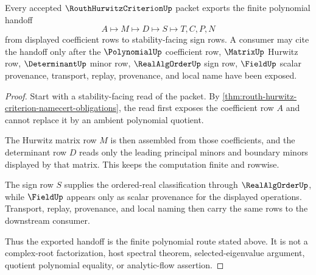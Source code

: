 \begin{theorem}
\label{thm:routh-hurwitz-criterion-polynomial-handoff}
Every accepted $\RouthHurwitzCriterionUp$ packet exports the finite polynomial handoff
$$
A \longmapsto M \longmapsto D \longmapsto S \longmapsto T,C,P,N
$$
from displayed coefficient rows to stability-facing sign rows. A consumer may cite the handoff only after the $\PolynomialUp$ coefficient row, $\MatrixUp$ Hurwitz row, $\DeterminantUp$ minor row, $\RealAlgOrderUp$ sign row, $\FieldUp$ scalar provenance, transport, replay, provenance, and local name have been exposed.
\end{theorem}
\begin{proof}
Start with a stability-facing read of the packet. By \autoref{thm:routh-hurwitz-criterion-namecert-obligations}, the read first exposes the coefficient row $A$ and cannot replace it by an ambient polynomial quotient.

The Hurwitz matrix row $M$ is then assembled from those coefficients, and the determinant row $D$ reads only the leading principal minors and boundary minors displayed by that matrix. This keeps the computation finite and rowwise.

The sign row $S$ supplies the ordered-real classification through $\RealAlgOrderUp$, while $\FieldUp$ appears only as scalar provenance for the displayed operations. Transport, replay, provenance, and local naming then carry the same rows to the downstream consumer.

Thus the exported handoff is the finite polynomial route stated above. It is not a complex-root factorization, host spectral theorem, selected-eigenvalue argument, quotient polynomial equality, or analytic-flow assertion.
\end{proof}

